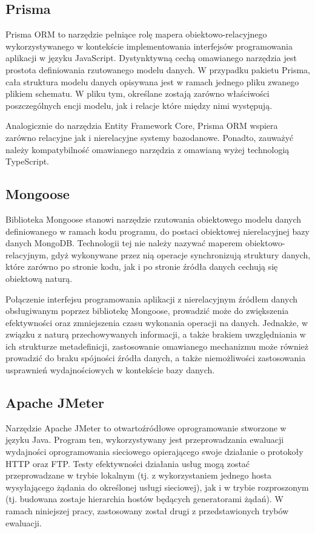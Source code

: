 \subsection*{Prisma}
Prisma ORM to narzędzie pełniące rolę mapera obiektowo-relacyjnego wykorzystywanego w kontekście implementowania interfejsów programowania aplikacji w języku JavaScript. Dystynktywną cechą omawianego narzędzia jest prostota definiowania rzutowanego modelu danych. W przypadku pakietu Prisma, cała struktura modelu danych opisywana jest w ramach jednego pliku zwanego plikiem schematu. W pliku tym, określane zostają zarówno właściwości poszczególnych encji modelu, jak i relacje które między nimi występują.

Analogicznie do narzędzia Entity Framework Core, Prisma ORM wspiera zarówno relacyjne jak i nierelacyjne systemy bazodanowe. Ponadto, zauważyć należy kompatybilność omawianego narzędzia z omawianą wyżej technologią TypeScript.
\subsection*{Mongoose}
Biblioteka Mongoose stanowi narzędzie rzutowania obiektowego modelu danych definiowanego w ramach kodu programu, do postaci obiektowej nierelacyjnej bazy danych MongoDB. Technologii tej nie należy nazywać maperem obiektowo-relacyjnym, gdyż wykonywane przez nią operacje synchronizują struktury danych, które zarówno po stronie kodu, jak i po stronie źródła danych cechują się obiektową naturą.

Połączenie interfejsu programowania aplikacji z nierelacyjnym źródłem danych obsługiwanym poprzez bibliotekę Mongoose, prowadzić może do zwiększenia efektywności oraz zmniejszenia czasu wykonania operacji na danych. Jednakże, w związku z naturą przechowywanych informacji, a także brakiem uwzględniania w ich strukturze metadefinicji, zastosowanie omawianego mechanizmu może również prowadzić do braku spójności źródła danych, a także niemożliwości zastosowania usprawnień wydajnościowych w kontekście bazy danych.  
\subsection*{Apache JMeter}
Narzędzie Apache JMeter to otwartoźródłowe oprogramowanie stworzone w języku Java. Program ten, wykorzystywany jest przeprowadzania ewaluacji wydajności oprogramowania sieciowego opierającego swoje działanie o protokoły HTTP oraz FTP. Testy efektywności działania usług mogą zostać przeprowadzane w trybie lokalnym (tj. z wykorzystaniem jednego hosta wysyłającego żądania do określonej usługi sieciowej), jak i w trybie rozproszonym (tj. budowana zostaje hierarchia hostów będących generatorami żądań). W ramach niniejszej pracy, zastosowany został drugi z przedstawionych trybów ewaluacji.

